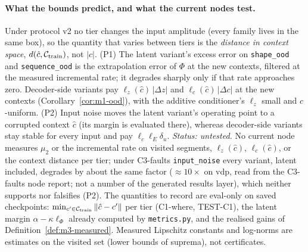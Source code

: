 \paragraph{What the bounds predict, and what the current nodes test.} Under protocol v2 no tier changes the input
amplitude (every family lives in the same box), so the quantity that varies between tiers is the \emph{distance in context
space}, $d(\hat c,\mathcal C_{\rm train})$, not $|c|$. (P1) The latent variant's excess error on \texttt{shape\_ood} and
\texttt{sequence\_ood} is the extrapolation error of $\Phi$ at the new contexts, filtered at the measured incremental rate;
it degrades sharply only if that rate approaches zero. Decoder-side variants pay $\ell_z(\hat c)\,|\Delta z|$ and
$\ell_c(\hat c)\,|\Delta c|$ at the new contexts (Corollary~\ref{cor:m1-ood}), with the additive conditioner's $\ell_z$ small
and $c$-uniform. (P2) Input noise moves the latent variant's operating point to a corrupted context $\hat c$ (its margin is
evaluated there), whereas decoder-side variants stay stable for every input and pay $\ell_c\ell_E\delta_u$.
\emph{Status: untested.} No current node measures $\mu_2$ or the incremental rate on visited segments, $\ell_z(\hat c)$,
$\ell_c(\hat c)$, or the context distance per tier; under C3-faults \texttt{input\_noise} every variant, latent included,
degrades by about the same factor ($\approx10\times$ on vdp, read from the C3-faults node report; not a number of the
generated results layer), which neither supports nor falsifies (P2). The quantities to
record are eval-only on saved checkpoints: $\min_{c'\in\mathcal C_{\rm train}}\|\hat c-c'\|$ per tier (C1-where,
TEST-C1), the latent margin $\alpha-\kappa\ell_\Phi$ already computed by \texttt{metrics.py}, and the realised gains of
Definition~\ref{def:m3-measured}. Measured Lipschitz constants and log-norms are estimates on the visited set (lower
bounds of suprema), not certificates.

